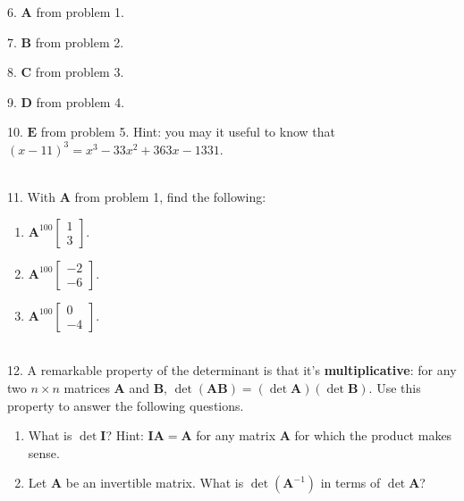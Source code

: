 \documentclass{article}
\begin{document}
6. $\mathbf{A}$ from problem 1.

7. $\mathbf{B}$ from problem 2.

8. $\mathbf{C}$ from problem 3.

9. $\mathbf{D}$ from problem 4.

10. $\mathbf{E}$ from problem 5. Hint: you may it useful to know that $(x - 11)^3 = x^3 - 33x^2 + 363x - 1331$.

~\\

11. With $\mathbf{A}$ from problem 1, find the following:

\begin{enumerate}

	\item $\displaystyle \mathbf{A}^{100} \left[\begin{array}{c}1 \\ 3\end{array}\right].$

	\item $\displaystyle \mathbf{A}^{100} \left[\begin{array}{c}-2 \\ -6\end{array}\right].$

	\item $\displaystyle \mathbf{A}^{100} \left[\begin{array}{c}0 \\ -4\end{array}\right].$

\end{enumerate}

~\\

12. A remarkable property of the determinant is that it's \textbf{multiplicative}: for any two $n \times n$ matrices $\mathbf{A}$ and $\mathbf{B}$, $\det (\mathbf{AB}) = \left( \det \mathbf{A} \right)\left( \det \mathbf{B} \right)$. Use this property to answer the following questions.

\begin{enumerate}

	\item What is $\det \mathbf{I}$? Hint: $\mathbf{IA} = \mathbf{A}$ for any matrix $\mathbf{A}$ for which the product makes sense.

	\item Let $\mathbf{A}$ be an invertible matrix. What is $\det \left(\mathbf{A}^{-1}\right)$ in terms of $\det \mathbf{A}$?

\end{enumerate}
\end{document}
